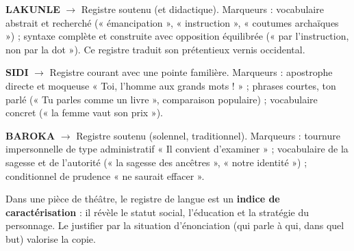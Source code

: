 \documentclass[11pt]{article}
\newcommand{\cle}[1]{{\popxbold\color{popdark}#1}}
\begin{document}
\begin{corrige}
\textbf{LAKUNLE} $\rightarrow$ Registre \cle{soutenu} (et didactique). Marqueurs : vocabulaire abstrait et recherché (« émancipation », « instruction », « coutumes archaïques ») ; syntaxe complète et construite avec opposition équilibrée (« par l'instruction, non par la dot »). Ce registre traduit son prétentieux vernis occidental.

\textbf{SIDI} $\rightarrow$ Registre \cle{courant} avec une pointe familière. Marqueurs : apostrophe directe et moqueuse « Toi, l'homme aux grands mots ! » ; phrases courtes, ton parlé (« Tu parles comme un livre », comparaison populaire) ; vocabulaire concret (« la femme vaut son prix »).

\textbf{BAROKA} $\rightarrow$ Registre \cle{soutenu} (solennel, traditionnel). Marqueurs : tournure impersonnelle de type administratif « Il convient d'examiner » ; vocabulaire de la sagesse et de l'autorité (« la sagesse des ancêtres », « notre identité ») ; conditionnel de prudence « ne saurait effacer ».
\end{corrige}

\begin{attention}
Dans une pièce de théâtre, le registre de langue est un \textbf{indice de caractérisation} : il révèle le statut social, l'éducation et la stratégie du personnage. Le justifier par la situation d'énonciation (qui parle à qui, dans quel but) valorise la copie.
\end{attention}
\end{document}

